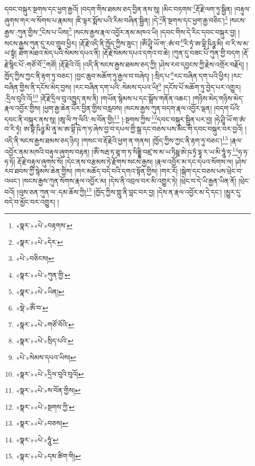 དབང་བསྐུར་སྔགས་དང་ཕྱག་རྒྱའོ། །བདག་གིས་ཐམས་ཅད་བྱིན་ནས་སུ། །མིང་བཏགས་\footnote{«སྣར་»«པེ་»བརྟགས་}རྡོ་རྗེ་ལག་ཏུ་སྦྱིན། །བརྟུལ་ཞུགས་གར་ལ་སོགས་པ་རྣམས། །ཇི་ལྟར་སྨོས་པའི་རིམ་བཞིན་སྦྱིན། །དེ་\footnote{«སྣར་»«པེ་»དེར་}ནི་སྔགས་དང་ཕྱག་རྒྱ་བཅིང་།\footnote{«པེ་»བཅིངས།} །སངས་རྒྱས་:ཀུན་གྱིས་\footnote{«སྣར་»«པེ་»ཀུན་གྱི་}ངེས་པ་ཡིས།\footnote{«སྣར་»«པེ་»ཡིན།} །སངས་རྒྱས་རྣལ་འབྱོར་ནམ་མཁའ་ཡི། །དབང་གིས་དེ་རིང་དབང་བསྐུར་བྱ། །སངས་རྒྱས་ཀུན་དུ་རབ་གྲུབ་ཕྱིར། །རྡོ་རྗེ་འདི་ནི་ཁྱོད་ཀྱིས་ཟུང་། །ཨོཾ་ཤྲཱི་ཡོ་ག་:ཨཾ་བ་\footnote{«སྡེ་»ཨོཾ་བ་}རི་ཏྭཾ་ཨ་བྷི་ཥིཉྩ་མི། བ་རི་ས་མ་ཡ་སྟྭཾ། ཐོག་མཐའ་མེད་པའི་སེམས་དཔའ་ནི། །རྡོ་རྗེ་སེམས་དཔའ་དགའ་བ་ཆེ། །ཀུན་དུ་བཟང་པོ་ཀུན་གྱི་བདག །རྡོ་རྗེ་སྙིང་པོ་:གཙོ་བོ་\footnote{«སྣར་»«པེ་»གཙོ་བོའི་}གཙོ། །རྡོ་རྗེའི་འོ། །འདི་ནི་སངས་རྒྱས་ཐམས་ཅད་ཀྱི། །ཤེས་རབ་དབྱངས་ཀྱི་རྗེས་འགྲོར་བརྗོད། །ཁྱོད་ཀྱིས་ཀྱང་ནི་རྟག་ཏུ་བཅང་། །བྱང་ཆུབ་མཆོག་ཏུ་རྒྱལ་བ་བཞེད། །:སྲིད་པ་\footnote{«སྣར་»«པེ་»སྲིད་པའི་}རང་བཞིན་དག་པའི་ཕྱིར། །རང་བཞིན་གྱིས་ནི་དངོས་མེད་བྱས། །རང་བཞིན་དག་པའི་:སེམས་དཔའ་ཡི།\footnote{«པེ་»སེམས་དཔའ་ཡིས།} །དངོས་པོ་མཆོག་ཏུ་བྱེད་པར་འགྱུར། :དྲིལ་བུའི་འོ།\footnote{«སྣར་»«པེ་»དྲིལ་བུའི་བུའོ།} །རྡོ་རྗེ་དྲིལ་བུ་འཁྱུད་ནས་ནི། །གཡོན་སྙེམས་པ་དང་སྒྲོས་གནོན་འཆང་། །གཉིས་མེད་གཉིས་མེད་རྣལ་འབྱོར་གྱིས། །ཕྱག་རྒྱ་ཆེན་པོར་བྱིན་གྱིས་བརླབས། །སངས་རྒྱས་ཀུན་བདག་རྣལ་འབྱོར་ལྡན། །བདག་པོའི་དབང་ནི་བསྐུར་ནས་སུ། །ཨཱ་ལི་ཀཱ་ལིའི་:ས་བོན་གྱི།\footnote{«སྣར་»«པེ་»ས་བོན་གྱིས།} །:སྔགས་ཀྱིས་\footnote{«སྣར་»«པེ་»སྔགས་ཀྱི་}དབང་བསྐུར་སྦྱིན་པར་བྱ། །ཧེ་ཤྲཱི་ཡོ་ག་ཨཾ་བ་རི་ཏྭཾ། ཨ་བྷི་ཥིཉྩ་མི་ནཱ་མ་ཨ་བྷི་ཥེ་ཀ་ཏ་ཞེས་བྱ་བ་དཔལ་གྱི་སྒྲ་དང་བཅས་པས་མིང་གི་དབང་བསྐུར་བར་བྱའོ། །འདི་ནི་སངས་རྒྱས་ཐམས་ཅད་ཉིད། །གསང་བ་རྡོ་རྗེའི་ཕྱག་ན་གནས། །ཁྱོད་ཀྱིས་ཀྱང་ནི་རྟག་ཏུ་བཅང་།\footnote{«སྣར་»«པེ་»བཅས།} །རྣལ་འབྱོར་ནམ་མཁའི་བརྟུལ་ཞུགས་བརྟན། །ཨོཾ་སརྦ་ཏ་ཐཱ་ག་ཏ་སིདྡྷི་བཛྲ་ས་མ་ཡ་ཏིཥྛ་ཨེ་ཥ་ཏྭཾ་དྷཱ་ར་ཡ་མི་ཧཱུཾ་ཧ་\footnote{«སྣར་»«པེ་»ཧཱུཾ་}ཧ་ཧ་ཧ་ཧོ། རྡོ་རྗེ་བརྟུལ་ཞུགས་སོ། །དེང་ནས་བརྩམས་ཏེ་རྫོགས་སངས་རྒྱས། །རྣལ་འབྱོར་མ་དང་དཔའ་སོགས་ལ། །ཤེས་རབ་ཐབས་ཀྱི་སྙེམས་ཆེན་གྱིས། །གར་མཆོད་བདེ་བའི་དགའ་སྟོན་གྱིས། །གར་རོ། །སྒེག་དང་བཅས་པས་ཕྲེང་བ་འཕང་། །སངས་རྒྱས་ཀུན་སོགས་རྣལ་འབྱོར་མ། །དེས་ནི་འབྲལ་བར་མི་འགྱུར་ཏེ། །ཕྲེང་བ་དེ་ཡི་རྒྱན་ཡིན་ནོ། །ཕྲེང་བའོ། །ལུས་ཅན་ཀུན་ལ་:དམ་ཆོས་ཀྱི།\footnote{«སྣར་»«པེ་»དམ་ཚིག་གི།} །ཁྱོད་ཀྱིས་གླུ་ནི་བླང་བར་བྱ། །དེས་ན་རྣལ་འབྱོར་མ་དེ་དང་། །མྱུར་དུ་བདེ་བ་མྱོང་བར་འགྱུར། །
